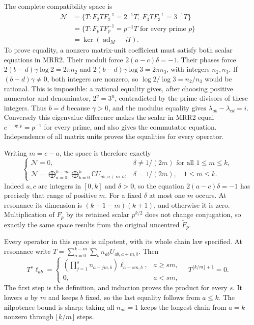 The complete compatibility space is
\[
\begin{split}
\mathscr N
&=\{T:F_2TF_2^{-1}=2^{-1}T,
            \ F_3TF_3^{-1}=3^{-1}T\}\\
&=\{T:F_pTF_p^{-1}=p^{-1}T\text{ for every prime }p\}\\
&=\ker(\operatorname{ad}_M-iI).
\end{split}
\tag{MRR3}
\]
To prove equality, a nonzero matrix-unit coefficient must
satisfy both scalar equations in MRR2. Their moduli force
$2(a-c)\delta=-1$. Their phases force
$2(b-d)\gamma\log2=2\pi n_2$ and
$2(b-d)\gamma\log3=2\pi n_3$, with integers $n_2,n_3$.
If $(b-d)\gamma\ne0$, both integers are nonzero, so
$\log2/\log3=n_2/n_3$ would be rational.
This is impossible: a rational equality gives, after choosing
positive numerator and denominator, $2^v=3^u$, contradicted
by the prime divisors of these integers.
Thus $b=d$ because $\gamma>0$, and the modulus equality gives
$\lambda_{ab}-\lambda_{cd}=i$.
Conversely this eigenvalue difference makes the scalar in
MRR2 equal $e^{-\log p}=p^{-1}$ for every prime, and also
gives the commutator equation. Independence of all matrix
units proves the equalities for every operator.

Writing $m=c-a$, the space is therefore exactly
\[
\boxed{
\begin{cases}
\mathscr N=0,&\delta\ne1/(2m)\text{ for all }1\le m\le k,\\[2pt]
\mathscr N=
 \displaystyle\bigoplus_{a=0}^{k-m}\bigoplus_{b=0}^k
          \mathbb C U_{ab,a+m,b},
 &\delta=1/(2m),\quad1\le m\le k.
\end{cases}}
\tag{MRR4}
\]
Indeed $a,c$ are integers in $[0,k]$ and $\delta>0$, so the
equation $2(a-c)\delta=-1$ has precisely that range of positive
$m$. For a fixed $\delta$ at most one $m$ occurs.
At resonance its dimension is $(k+1-m)(k+1)$, and otherwise
it is zero.
Multiplication of $F_p$ by its retained scalar $p^{k/2}$ does
not change conjugation, so exactly the same space results
from the original uncentred $\widetilde F_p$.

Every operator in this space is nilpotent, with its whole
chain law specified. At resonance write
$T=\sum_{a=0}^{k-m}\sum_b n_{ab}U_{ab,a+m,b}$.
Then
\[
T^s\ell_{ab}=
\begin{cases}
\left(\displaystyle\prod_{j=1}^s n_{a-jm,b}\right)
                         \ell_{a-sm,b},&a\ge sm,\\
0,&a<sm,
\end{cases}
\quad T^{\lfloor k/m\rfloor+1}=0.
\tag{MRR5}
\]
The first step is the definition, and induction proves the
product for every $s$. It lowers $a$ by $m$ and keeps $b$
fixed, so the last equality follows from $a\le k$.
The nilpotence bound is sharp: taking all $n_{ab}=1$ keeps
the longest chain from $a=k$ nonzero through
$\lfloor k/m\rfloor$ steps.


